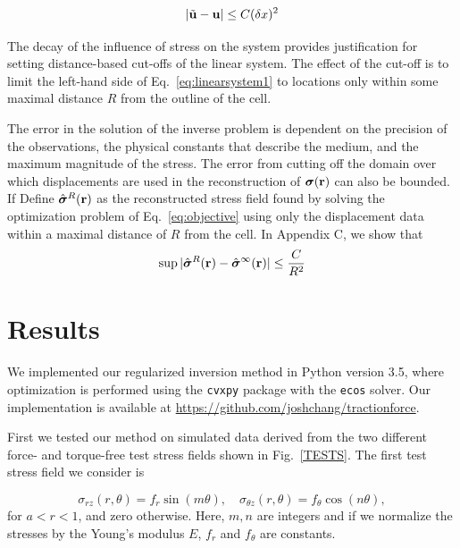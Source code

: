 \documentclass[aps,prl,reprint,twocolumn,groupedaddress,showpacs]{revtex4-1}
\newcommand{\bsigma}{{\boldsymbol\sigma}}
\def\r{{\bf r}}
\def\u{{\bf u}}
\begin{document}
\begin{equation}
\vert \tilde{\u}  - \u \vert \leq C (\delta x)^2
\end{equation}

The decay of the influence of stress on the system provides
justification for setting distance-based cut-offs of the linear
system. The effect of the cut-off is to limit the left-hand side of
Eq.~\ref{eq:linearsystem1} to locations only within some maximal
distance $R$ from the outline of the cell.

The error in the solution of the inverse problem is dependent on the
precision of the observations, the physical constants that describe
the medium, and the maximum magnitude of the stress. The error from
cutting off the domain over which displacements are used in the
reconstruction of $\bsigma(\r)$ can also be bounded. If
Define $\hat{\bsigma}^R(\r)$ as the reconstructed stress field found by
solving the optimization problem of Eq.~\ref{eq:objective} using only
the displacement data within a maximal distance of $R$ from the
cell. In Appendix C, we show that 
\begin{equation}
\sup \vert \hat{\bsigma}^R(\r) - \hat{\bsigma}^\infty(\r) \vert \leq \frac{C}{R^2}
\end{equation}

\section{Results}

We implemented our regularized inversion method in Python version 3.5,
where optimization is performed using the \texttt{cvxpy} package with
the \texttt{ecos} solver.  Our implementation is available at
\url{https://github.com/joshchang/tractionforce}. 

First we tested our method on simulated data derived from the two
different force- and torque-free test stress fields shown in
Fig.~\ref{TESTS}. The first test stress field we consider is

\begin{equation}
\sigma_{rz}(r,\theta) = f_{r} \sin (m\theta),\quad 
\sigma_{\theta z}(r,\theta) = f_{\theta} \cos (n\theta),
\end{equation}
%
for $a < r < 1$, and zero otherwise. Here, $m,n$ are integers and
if we normalize the stresses by the Young's modulus $E$, $f_{r}$ and
$f_{\theta}$ are constants.
\end{document}
